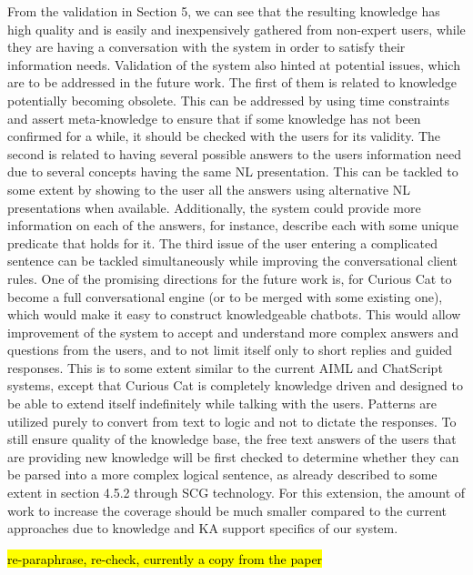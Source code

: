 From the validation in Section 5, we can see that the resulting knowledge has high quality and is easily and inexpensively gathered from non-expert users, while they are having a conversation with the system in order to satisfy their information needs. Validation of the system also hinted at potential issues, which are to be addressed in the future work. The first of them is related to knowledge potentially becoming obsolete. This can be addressed by using time constraints and assert meta-knowledge to ensure that if some knowledge has not been confirmed for a while, it should be checked with the users for its validity. The second is related to having several possible answers to the users information need due to several concepts having the same NL presentation. This can be tackled to some extent by showing to the user all the answers using alternative NL presentations when available. Additionally, the system could provide more information on each of the answers, for instance, describe each with some unique predicate that holds for it. The third issue of the user entering a complicated sentence can be tackled simultaneously while improving the conversational client rules. 
One of the promising directions for the future work is, for Curious Cat to become a full conversational engine (or to be merged with some existing one), which would make it easy to construct knowledgeable chatbots. This would allow improvement of the system to accept and understand more complex answers and questions from the users, and to not limit itself only to short replies and guided responses. This is to some extent similar to the current AIML and ChatScript systems, except that Curious Cat is completely knowledge driven and designed to be able to extend itself indefinitely while talking with the users. Patterns are utilized purely to convert from text to logic and not to dictate the responses. To still ensure quality of the knowledge base, the free text answers of the users that are providing new knowledge will be first checked to determine whether they can be parsed into a more complex logical sentence, as already described to some extent in section 4.5.2 through SCG technology. For this extension, the amount of work to increase the coverage should be much smaller compared to the current approaches due to knowledge and KA support specifics of our system.

\hl{re-paraphrase, re-check, currently a copy from the paper}
